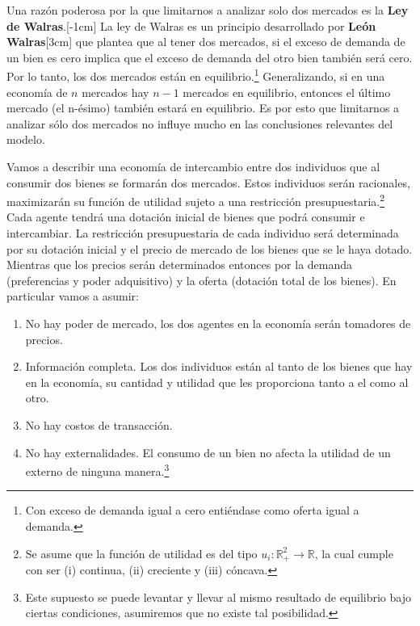Una razón poderosa por la que limitarnos a analizar solo dos mercados es la \textbf{Ley de Walras}.[-1cm] La ley de Walras es un principio desarrollado por \textbf{León Walras}[3cm] que plantea que al tener dos mercados, si el exceso de demanda de un bien es cero implica que el exceso de demanda del otro bien también será cero. Por lo tanto, los dos mercados están en equilibrio.\footnote{Con exceso de demanda igual a cero entiéndase como oferta igual a demanda.} Generalizando, si en una economía de $n$ mercados hay $n-1$ mercados en equilibrio, entonces el último mercado (el n-ésimo) también estará en equilibrio. Es por esto que limitarnos a analizar sólo dos mercados no influye mucho en las conclusiones relevantes del modelo. 

Vamos a describir una economía de intercambio entre dos individuos que al consumir dos bienes se formarán dos mercados. Estos individuos serán racionales, maximizarán su función de utilidad sujeto a una restricción presupuestaria.\footnote{Se asume que la función de utilidad es del tipo $u_i: \mathbb{R}_+^2 \xrightarrow{} \mathbb{R}$, la cual cumple con ser (i) continua, (ii) creciente y (iii) cóncava.} Cada agente tendrá una dotación inicial de bienes que podrá consumir e intercambiar. La restricción presupuestaria de cada individuo será determinada por su dotación inicial y el precio de mercado de los bienes que se le haya dotado. Mientras que los precios serán determinados entonces por la demanda (preferencias y poder adquisitivo) y la oferta (dotación total de los bienes). En particular vamos a asumir:

\begin{enumerate}
    \item No hay poder de mercado, los dos agentes en la economía serán tomadores de precios. 
    \item Información completa. Los dos individuos están al tanto de los bienes que hay en la economía, su cantidad y utilidad que les proporciona tanto a el como al otro. 
    \item No hay costos de transacción. 
    \item No hay externalidades. El consumo de un bien no afecta la utilidad de un externo de ninguna manera.\footnote{Este supuesto se puede levantar y llevar al mismo resultado de equilibrio bajo ciertas condiciones, asumiremos que no existe tal posibilidad.} 
\end{enumerate}

